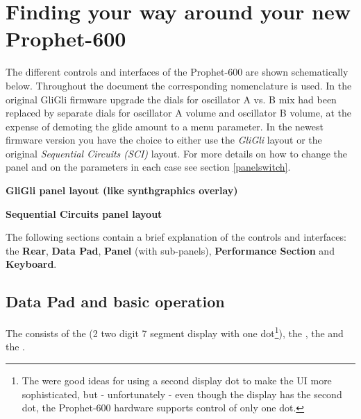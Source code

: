 \documentclass[landscape, 11pt, oneside, twoside]{report}
\newenvironment{flowtext}{\addmargin[0cm]{0cm}}{\endaddmargin} %
\begin{document}
\pagebreak

\chapter{Finding your way around your new  Prophet-600}    

\begin{flowtext}

The different controls and interfaces of the Prophet-600 are shown schematically below. Throughout the document the corresponding nomenclature is used. In the original GliGli firmware upgrade the dials for oscillator A vs. B mix had been replaced by separate dials for oscillator A volume and oscillator B volume, at the expense of demoting the glide amount to a menu parameter. In the newest firmware version you have the choice to either use the \textit{GliGli} layout or the original \textit{Sequential Circuits (SCI)} layout. For more details on how to change the panel and on the parameters in each case see section \ref{panelswitch}.

\begin{samepage}
  \textbf{GliGli panel layout (like synthgraphics overlay)}
  
  \nopagebreak
  \scalebox{0.2}{
    \begin{tikzpicture}[scale=0.8]
      
    \end{tikzpicture}
  }
\end{samepage}

\begin{samepage}

  \textbf{Sequential Circuits panel layout}
  
  \nopagebreak
  \scalebox{0.2}{
    \begin{tikzpicture}[scale=0.8]
      
    \end{tikzpicture}
  }
\end{samepage}

The following sections contain a brief explanation of the controls and interfaces: the \textbf{Rear}, \textbf{Data Pad}, \textbf{Panel} (with sub-panels), \textbf{Performance Section} and \textbf{Keyboard}.

\section{Data Pad and basic operation}\label{datapad}

The \datapad consists of the \display (2 two digit 7 segment display with one dot\footnote{The were good ideas for using a second display dot to make the UI more sophisticated, but - unfortunately - even though the display has the second dot, the Prophet-600 hardware supports control of only one dot.}), the \termnumberpad, the \funcbuttons and the \datadial. 


\end{flowtext}
\end{document}
